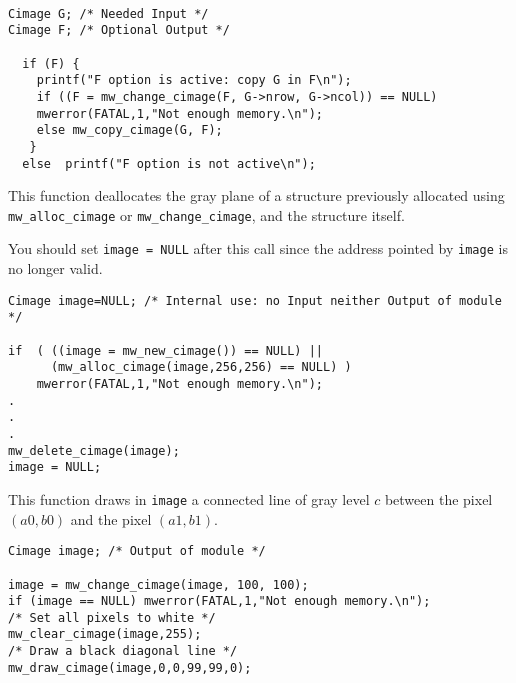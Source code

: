 \Next
\Example
\begin{verbatim}

Cimage G; /* Needed Input */
Cimage F; /* Optional Output */

  if (F) {
    printf("F option is active: copy G in F\n");
    if ((F = mw_change_cimage(F, G->nrow, G->ncol)) == NULL)
	mwerror(FATAL,1,"Not enough memory.\n");
    else mw_copy_cimage(G, F);
   }
  else  printf("F option is not active\n");
\end{verbatim}

\newpage %

\Description
This function deallocates the gray plane of a \cimage structure previously
allocated using \verb+mw_alloc_cimage+ or \verb+mw_change_cimage+, and the
structure itself. 

You should set \verb+image = NULL+ after this call since the address pointed
by \verb+image+ is no longer valid.

\Next
\Example
\begin{verbatim}
Cimage image=NULL; /* Internal use: no Input neither Output of module */

if  ( ((image = mw_new_cimage()) == NULL) ||
      (mw_alloc_cimage(image,256,256) == NULL) )
    mwerror(FATAL,1,"Not enough memory.\n");
.
.
.
mw_delete_cimage(image);
image = NULL;

\end{verbatim}

\newpage %


\Description
This function draws in \verb+image+ a connected line of gray level $c$ between the pixel $(a0,b0)$ and the pixel $(a1,b1)$.

\Next
\Example
\begin{verbatim}
Cimage image; /* Output of module */

image = mw_change_cimage(image, 100, 100);
if (image == NULL) mwerror(FATAL,1,"Not enough memory.\n");
/* Set all pixels to white */
mw_clear_cimage(image,255);
/* Draw a black diagonal line */
mw_draw_cimage(image,0,0,99,99,0);
\end{verbatim}

